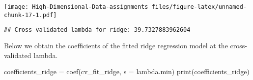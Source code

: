 \documentclass[
]{book}
\newenvironment{Shaded}{\begin{snugshade}}{\end{snugshade}}
\newcommand{\AttributeTok}[1]{\textcolor[rgb]{0.77,0.63,0.00}{#1}}
\newcommand{\CommentTok}[1]{\textcolor[rgb]{0.56,0.35,0.01}{\textit{#1}}}
\newcommand{\FunctionTok}[1]{\textcolor[rgb]{0.00,0.00,0.00}{#1}}
\newcommand{\NormalTok}[1]{#1}
\newcommand{\OtherTok}[1]{\textcolor[rgb]{0.56,0.35,0.01}{#1}}
\newcommand{\SpecialCharTok}[1]{\textcolor[rgb]{0.00,0.00,0.00}{#1}}
\newcommand{\StringTok}[1]{\textcolor[rgb]{0.31,0.60,0.02}{#1}}
\begin{document}
\texttt{[image: High-Dimensional-Data-assignments\_files/figure-latex/unnamed-chunk-17-1.pdf]}

\begin{Shaded}
\end{Shaded}

\begin{verbatim}
## Cross-validated lambda for ridge: 39.7327883962604
\end{verbatim}

Below we obtain the coefficients of the fitted ridge regression model at the cross-validated lambda.

\begin{Shaded}
\begin{Highlighting}[]
\NormalTok{coefficients\_ridge }\OtherTok{=} \FunctionTok{coef}\NormalTok{(cv\_fit\_ridge, }\AttributeTok{s =} \StringTok{\textquotesingle{}lambda.min\textquotesingle{}}\NormalTok{)}
\FunctionTok{print}\NormalTok{(coefficients\_ridge)}
\end{Highlighting}
\end{Shaded}
\end{document}

